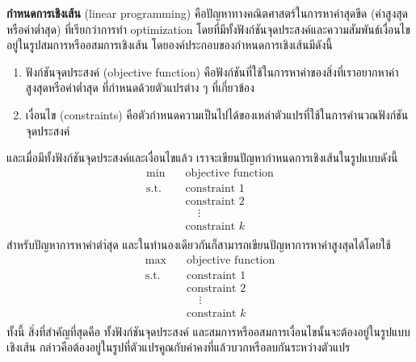 \textbf{กำหนดการเชิงเส้น} (linear programming) คือปัญหาทางคณิตศาสตร์ในการหาค่าสุดขีด (ค่าสูงสุดหรือค่าต่ำสุด) ที่เรียกว่าการทำ optimization โดยที่มีทั้งฟังก์ชันจุดประสงค์และความสัมพันธ์เงื่อนไขอยู่ในรูปสมการหรืออสมการเชิงเส้น โดยองค์ประกอบของกำหนดการเชิงเส้นมีดังนี้
\begin{enumerate}
    \item ฟังก์ชันจุดประสงค์ (objective function) คือฟังก์ชันที่ใช้ในการหาค่าของสิ่งที่เราอยากหาค่าสูงสุดหรือค่าต่ำสุด ที่กำหนดด้วยตัวแปรต่าง ๆ ที่เกี่ยวข้อง
    \item เงื่อนไข (constraints) คือตัวกำหนดความเป็นไปได้ของเหล่าตัวแปรที่ใช้ในการคำนวณฟังก์ชันจุดประสงค์
\end{enumerate}
และเมื่อมีทั้งฟังก์ชันจุดประสงค์และเงื่อนไขแล้ว เราจะเขียนปัญหากำหนดการเชิงเส้นในรูปแบบดังนี้
\begin{align*}
\min  &\quad \text{objective function} \\
\text{s.t.} &\quad \text{constraint } 1\\
            &\quad \text{constraint } 2\\
            &\quad \ \ \ \ \ \vdots\\
            &\quad \text{constraint } k\\
\end{align*}
สำหรับปัญหาการหาค่าตำ่สุด และในทำนองเดียวกันก็สามารถเขียนปัญหาการหาค่าสูงสุดได้โดยใช้
\begin{align*}
\max  &\quad \text{objective function} \\
\text{s.t.} &\quad \text{constraint } 1\\
            &\quad \text{constraint } 2\\
            &\quad \ \ \ \ \ \vdots\\
            &\quad \text{constraint } k\\
\end{align*}
ทั้งนี้ สิ่งที่สำคัญที่สุดคือ ทั้งฟังก์ชันจุดประสงค์ และสมการหรืออสมการเงื่อนไขนั้นจะต้องอยู่ในรูปแบบเชิงเส้น กล่าวคือต้องอยู่ในรูปที่ตัวแปรคูณกับค่าคงที่แล้วบวกหรือลบกันระหว่างตัวแปร

